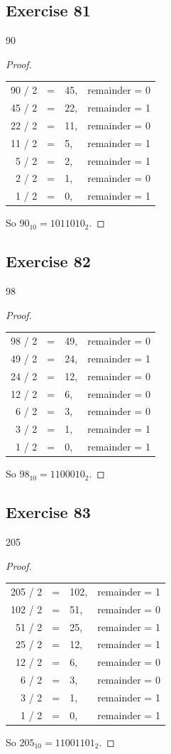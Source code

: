\documentclass[14pt]{extarticle}
\begin{document}
\subsection{Exercise 81}
90
\begin{proof}
\begin{center}
\begin{tabular}{rcll}
90 / 2 & = & 45, & remainder = 0 \\
45 / 2 & = & 22, & remainder = 1 \\
22 / 2 & = & 11, & remainder = 0 \\
11 / 2 & = & 5, & remainder = 1 \\
5 / 2 & = & 2, & remainder = 1 \\
2 / 2 & = & 1, & remainder = 0 \\
1 / 2 & = & 0, & remainder = 1
\end{tabular}
\end{center}
So $90_{10} = 1011010_2$.
\end{proof}

\subsection{Exercise 82}
98
\begin{proof}
\begin{center}
\begin{tabular}{rcll}
98 / 2 & = & 49, & remainder = 0 \\
49 / 2 & = & 24, & remainder = 1 \\
24 / 2 & = & 12, & remainder = 0 \\
12 / 2 & = & 6, & remainder = 0 \\
6 / 2 & = & 3, & remainder = 0 \\
3 / 2 & = & 1, & remainder = 1 \\
1 / 2 & = & 0, & remainder = 1
\end{tabular}
\end{center}
So $98_{10} = 1100010_2$.
\end{proof}

\subsection{Exercise 83}
205
\begin{proof}
\begin{center}
\begin{tabular}{rcll}
205 / 2 & = & 102, & remainder = 1 \\
102 / 2 & = & 51, & remainder = 0 \\
51 / 2 & = & 25, & remainder = 1 \\
25 / 2 & = & 12, & remainder = 1 \\
12 / 2 & = & 6, & remainder = 0 \\
6 / 2 & = & 3, & remainder = 0 \\
3 / 2 & = & 1, & remainder = 1 \\
1 / 2 & = & 0, & remainder = 1
\end{tabular}
\end{center}
So $205_{10} = 11001101_2$.
\end{proof}
\end{document}
